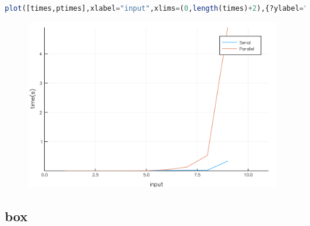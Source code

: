 \documentclass[a4paper,12pt]{article}
\begin{document}
\newpage
\begin{lstlisting}[language=Julia,format=Julia]
plot([times,ptimes],xlabel="input",xlims=(0,length(times)+2),{?ylabel="time(s)",label=["Serial","Parallel"])
\end{lstlisting}
\begin{figure}[ht!]
\centering
\includegraphics[width=11cm,scale=0.3]{larApplyC.png}
\end{figure}
\newpage
\subsection{box}
\end{document}
